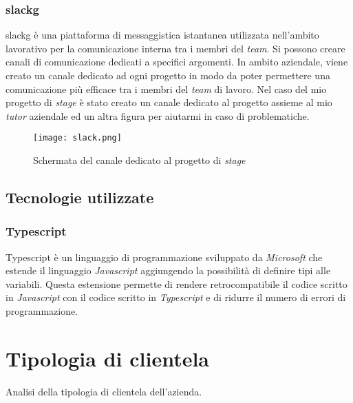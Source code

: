 \subsubsection{\gls{slackg}}
\gls{slackg} è una piattaforma di messaggistica istantanea utilizzata nell'ambito lavorativo per la comunicazione interna tra i membri del \textit{team}.
Si possono creare canali di comunicazione dedicati a specifici argomenti. In ambito aziendale, viene creato un canale dedicato ad ogni progetto in modo da poter permettere una comunicazione più efficace tra i membri del \textit{team} di lavoro.
Nel caso del mio progetto di \textit{stage} è stato creato un canale dedicato al progetto assieme al mio \textit{tutor} aziendale ed un altra figura per aiutarmi in caso di problematiche.
\begin{figure}[H]
    \centering
    \texttt{[image: slack.png]}
    \caption{Schermata del canale dedicato al progetto di \textit{stage}}
    \label{fig:Slack}
\end{figure}
\subsection{Tecnologie utilizzate}
\subsubsection{Typescript}
Typescript è un linguaggio di programmazione sviluppato da \textit{Microsoft} che estende il linguaggio \textit{Javascript} aggiungendo la possibilità di definire tipi alle variabili.
Questa estensione permette di rendere retrocompatibile il codice scritto in \textit{Javascript} con il codice scritto in \textit{Typescript} e di ridurre il numero di errori di programmazione.





\section{Tipologia di clientela}
Analisi della tipologia di clientela dell'azienda.

